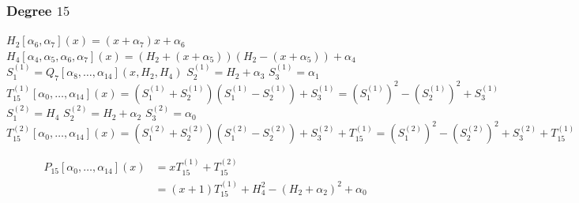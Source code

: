 \subsubsection{Degree \texorpdfstring{$15$}{15}}
\begin{algorithm}[H]
    \caption{
        Seven-product compatible joint realization in degree $15$.
    }

    \begin{algorithmic}
        \State $H_2[\alpha_6, \alpha_7](x) = (x + \alpha_7)x + \alpha_6$
        \State $H_4[\alpha_4, \alpha_5, \alpha_6, \alpha_7](x) = (H_2 + (x + \alpha_5))(H_2 - (x + \alpha_5)) + \alpha_4$
        \\
        \State $S^{(1)}_1 = Q_7[\alpha_8, \ldots, \alpha_{14}](x, H_2, H_4)$
        \State $S^{(1)}_2 = H_2 + \alpha_{3}$
        \State $S^{(1)}_3 = \alpha_1$
        \State $T^{(1)}_{15}[\alpha_0, \ldots, \alpha_{14}](x)
            = (S^{(1)}_1 + S^{(1)}_2)(S^{(1)}_1 - S^{(1)}_2) + S^{(1)}_3
            = (S^{(1)}_1)^2 - (S^{(1)}_2)^2 + S^{(1)}_3$
        \\
        \State $S^{(2)}_1 = H_4$
        \State $S^{(2)}_2 = H_2 + \alpha_2$
        \State $S^{(2)}_3 = \alpha_0$
        \State $T^{(2)}_{15}[\alpha_0, \ldots, \alpha_{14}](x)
            = (S^{(2)}_1 + S^{(2)}_2)(S^{(2)}_1 - S^{(2)}_2) + S^{(2)}_3 + T^{(1)}_{15}
            = (S^{(2)}_1)^2 - (S^{(2)}_2)^2 + S^{(2)}_3 + T^{(1)}_{15}$

        \State \begin{align}
            P_{15}[\alpha_0, \ldots, \alpha_{14}](x)
            &= x T^{(1)}_{15} + T^{(2)}_{15}
            \\&= (x+1)T^{(1)}_{15} + H_4^2 - (H_2 + \alpha_2)^2 + \alpha_0
        \end{align}
    \end{algorithmic}
\end{algorithm}

